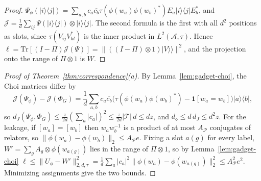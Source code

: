 \documentclass[11pt,a4paper]{article}
\theoremstyle{plain}
\theoremstyle{definition}
\theoremstyle{remark}
\newcommand{\dJ}{d_J}
\newcommand{\ddia}{d_\diamond}
\begin{document}
\begin{proof}
$\Psi_\phi(|i\rangle\langle j|)=\sum_{a,b}c_a\overline{c_b}\tau(\phi(w_a)\phi(w_b)^*)E_a|i\rangle\langle j|E_b^*$, and $\mathcal J=\frac1d\sum_{ij}\Psi(|i\rangle\langle j|)\otimes|i\rangle\langle j|$. The
second formula is the first with all $d^2$ positions as slots, since $\tau(V_{ij}V_{kl}^*)$ is the inner product in $L^2(\mathcal A,\tau)$. Hence
$\ell=\mathrm{Tr}[(I-\Pi)\mathcal J(\Psi)]=\|((I-\Pi)\otimes1)|V\rangle\!\rangle\|^2$, and the projection onto the range of $\Pi\otimes1$ is $W$.
\end{proof}

\begin{proof}[Proof of Theorem~\ref{thm:correspondence}(a)]
By Lemma~\ref{lem:gadget-choi}, the Choi matrices differ by
\[
\mathcal J(\Psi_\phi)-\mathcal J(\Phi_G)=\frac1d\sum_{a,b}c_a\overline{c_b}\big(\tau(\phi(w_a)\phi(w_b)^*)-\mathbf 1[w_a=w_b]\big)|a\rangle\langle b|,
\]
so
$\dJ(\Psi_\phi,\Phi_G)\le\frac z{2d}(\sum_a|c_a|)^2\le\frac z{2d}|\mathcal T|\,d\le dz$, and $\ddia\le d\,\dJ\le d^2z$. For the leakage, if $[w_a]=[w_b]$ then
$w_aw_b^{-1}$ is a product of at most $A_{\mathcal P}$ conjugates of relators, so $\|\phi(w_a)-\phi(w_b)\|_2\le A_{\mathcal P}e$. Fixing a slot $a(g)$ for every label,
$W'=\sum_gA_g\otimes\phi(w_{a(g)})$ lies in the range of $\Pi\otimes1$, so by Lemma~\ref{lem:gadget-choi}
$\ell\le\|U_\phi-W'\|_{2,d,\tau}^2=\frac1d\sum_a|c_a|^2\|\phi(w_a)-\phi(w_{a(g)})\|_2^2\le A_{\mathcal P}^2e^2$. Minimizing assignments give the two bounds.
\end{proof}
\end{document}
